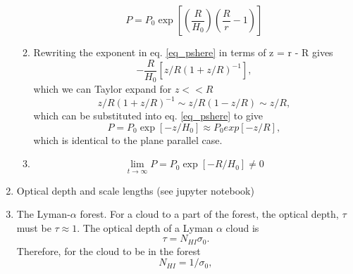 \documentclass{article}
\begin{document}
\begin{enumerate}
\begin{enumerate}
\begin{equation}
                P = P_0 \exp \left[ {\left ( \frac{R}{H_0} \right ) \left( \frac{R}{r} - 1\right)} \right] 
            \end{equation}
        \item
            Rewriting the exponent in eq. \ref{eq_pshere} in terms of z = r - R gives
            \begin{equation}
                - \frac{R}{H_0} \left [ z/R (1 + z/R)^{-1} \right ], 
            \end{equation}
            which we can Taylor expand for $z << R$
            \begin{equation} 
                z/R (1 + z/R)^{-1} \sim z/R (1 - z/R) \sim z/R,
            \end{equation}
            which can be substituted into eq. \ref{eq_pshere} to give  
            \begin{equation}
                P = P_0 \exp \left[ - z / H_0  \right] \approx P_0 exp \left[ -z / R \right],
            \end{equation}
            which is identical to the plane parallel case.        
        \item 
            \begin{equation}
                \lim_{t \rightarrow \infty} P = P_0 \exp \left[ - R / H_0 \right] \neq 0
            \end{equation} 
    \end{enumerate}
    \item Optical depth and scale lengths (see jupyter notebook)
    \item The Lyman-$\alpha$ forest.
        For a cloud to a part of the forest, the optical depth, $\tau$ must be $\tau \approx 1$.
        The optical depth of a Lyman $\alpha$ cloud is 
        \begin{equation}
            \tau = N_{HI} \sigma_0.
        \end{equation}
        Therefore, for the cloud to be in the forest
        \begin{equation}
            N_{HI} = 1 / \sigma_0, 
        \end{equation}


\end{enumerate}
\end{document}
